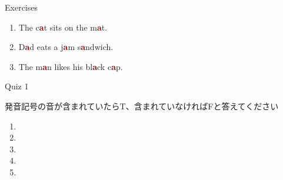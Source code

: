\documentclass[aspectratio=169,xcolor={dvipsnames,table}]{beamer}
\begin{document}
\begin{frame}[plain]{Exercises}
\LARGE

\begin{enumerate}
 \item The c\textcolor{Maroon}{\bfseries a}t sits on the m\textcolor{Maroon}{\bfseries a}t.
 \item D\textcolor{Maroon}{\bfseries a}d eats a j\textcolor{Maroon}{\bfseries a}m s\textcolor{Maroon}{\bfseries a}ndwich.
 \item The m\textcolor{Maroon}{\bfseries a}n likes his bl\textcolor{Maroon}{\bfseries a}ck c\textcolor{Maroon}{\bfseries a}p.
\end{enumerate}
\end{frame}
\begin{frame}[plain]{Quiz 1}

 発音記号\textipa{/\ae /}の音が含まれていたらT、含まれていなければFと答えてください

\LARGE
\begin{enumerate}
 \item \mbox{}\hfill{}\hspace{200pt}\mbox{}
 \item \mbox{}\hfill{}\hspace{200pt}\mbox{}
 \item \mbox{}\hfill{}\hspace{200pt}\mbox{}
 \item \mbox{}\hfill{}\hspace{200pt}\mbox{}
 \item \mbox{}\hfill{}\hspace{200pt}\mbox{}
\end{enumerate}
\end{frame}
\end{document}
